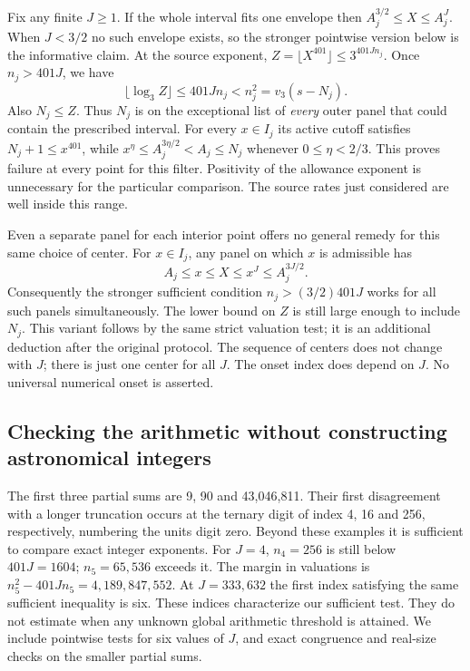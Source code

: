 \documentclass[12pt,letterpaper]{article}
\begin{document}
Fix any finite \(J\ge1\). If the whole interval fits one envelope then \(A_j^{3/2}\le X\le A_j^J\). When \(J<3/2\) no such envelope exists, so the stronger pointwise version below is the informative claim. At the source exponent, \(Z=\lfloor X^{401}\rfloor\le3^{401 Jn_j}\). Once \(n_j>401J\), we have
\[
    \lfloor\log_3 Z\rfloor\le401 Jn_j<n_j^2=v_3(s-N_j).
\]
Also \(N_j\le Z\). Thus \(N_j\) is on the exceptional list of \emph{every} outer panel that could contain the prescribed interval. For every \(x\in I_j\) its active cutoff satisfies \(N_j+1\le x^{401}\), while \(x^\eta\le A_j^{3\eta/2}<A_j\le N_j\) whenever \(0\le\eta<2/3\). This proves failure at every point for this filter. Positivity of the allowance exponent is unnecessary for the particular comparison. The source rates just considered are well inside this range.

Even a separate panel for each interior point offers no general remedy for this same choice of center. For \(x\in I_j\), any panel on which \(x\) is admissible has
\[
 A_j\le x\le X\le x^J\le A_j^{3J/2}.
\]
Consequently the stronger sufficient condition \(n_j> (3/2)401J\) works for all such panels simultaneously. The lower bound on \(Z\) is still large enough to include \(N_j\). This variant follows by the same strict valuation test; it is an additional deduction after the original protocol. The sequence of centers does not change with \(J\); there is just one center for all \(J\). The onset index does depend on \(J\). No universal numerical onset is asserted.

\subsection{Checking the arithmetic without constructing astronomical integers}
The first three partial sums are 9, 90 and 43,046,811. Their first disagreement with a longer truncation occurs at the ternary digit of index 4, 16 and 256, respectively, numbering the units digit zero. Beyond these examples it is sufficient to compare exact integer exponents. For \(J=4\), \(n_4=256\) is still below \(401J=1604\); \(n_5=65{,}536\) exceeds it. The margin in valuations is \(n_5^2-401J n_5=4{,}189{,}847{,}552\). At \(J=333{,}632\) the first index satisfying the same sufficient inequality is six. These indices characterize our sufficient test. They do not estimate when any unknown global arithmetic threshold is attained. We include pointwise tests for six values of \(J\), and exact congruence and real-size checks on the smaller partial sums.
\end{document}
